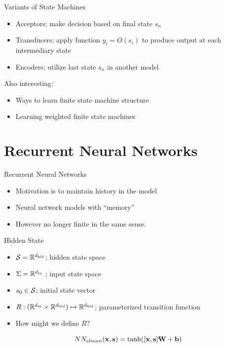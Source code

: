 \documentclass{beamer}
\begin{document}
\begin{frame}{Variants of State Machines}

  \begin{itemize}
  \item Acceptors; make decision based on final state $s_n$
    \air 

  \item Transducers; apply function $ y_i = O(s_i)$ to produce output at each intermediary state
    \air 

  \item Encoders; utilize last state $s_n$ in another model  
  \end{itemize}
  \air

  Also interesting:
  \begin{itemize}
  \item Ways to learn finite state machine structure
    \air 

  \item Learning weighted finite state machines 
  \end{itemize}
\end{frame}


\section{Recurrent Neural Networks}

\begin{frame}{Recurrent Neural Networks}
  \begin{itemize}
  \item Motivation is to maintain history in the model
    \air

  \item Neural network models with ``memory''
    \air

  \item However no longer finite in the same sense. 
  \end{itemize}
\end{frame}

\begin{frame}{Hidden State}
  \begin{itemize}
    \item  $\mathcal{S} = \mathbb{R}^{d_{\mathrm{hid}}}$; hidden state space
      \air

    \item  $\Sigma = \mathbb{R}^{d_{\mathrm{in}}}$ ; input state space
      \air
    \item $s_0 \in \mathcal{S}$; initial state vector
      \air

    \item  $R : (\mathbb{R}^{d_{\mathrm{in}}} \times \mathbb{R}^{d_{\mathrm{hid}}}) \mapsto \mathbb{R}^{{d_{\mathrm{hid}}}}$; parameterized transition function

  \air       
    \item How might we define $R$?
  \end{itemize}
  \pause

  \[ NN_{elman}(\mathbf{x}, \mathbf{s}) = \tanh([\mathbf{x}, \mathbf{s}] \mathbf{W}  + \mathbf{b})\]
\end{frame}
\end{document}
